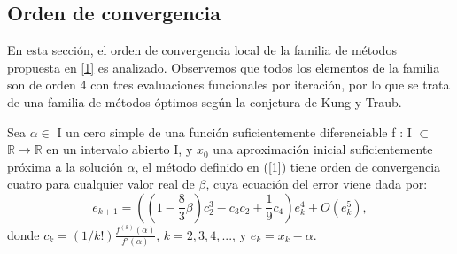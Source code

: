 \subsection{Orden de convergencia}
En esta sección, el orden de convergencia local de la familia de métodos propuesta en \eqref{1} es analizado. Observemos que todos los elementos de la familia son de orden 4 con tres evaluaciones funcionales por iteración, por lo que se trata de una familia de métodos óptimos según la conjetura de Kung y Traub.

\begin{theorem}\label{teorema1}
	Sea $\alpha \in$ I un cero simple de una función suficientemente diferenciable f : I $\subset$ $\mathbb{R} \to \mathbb{R}$ en un intervalo abierto I, y $x_0$ una aproximación inicial suficientemente próxima a la solución $\alpha$, el método definido en (\ref{1}) tiene orden de convergencia cuatro para cualquier valor real de $\beta$, cuya ecuación del error viene dada por:
	\begin{equation}\label{ecuacionerrorlichen}
	e_{k + 1} = \left(\left(1 - \frac{8}{3}\beta\right)c_2^3  -
	{c_3}{c_2} + \frac{1}{9}{c_4}\right)e_k^{4} + O({e_k^{5}}),
	\end{equation}
	donde ${c_k} = (1/k!)\frac{f^{(k)}(\alpha )}{f'(\alpha )}$, $k =
	2,3,4,...$, y $e_{k} = x_k - \alpha$.
\end{theorem}

